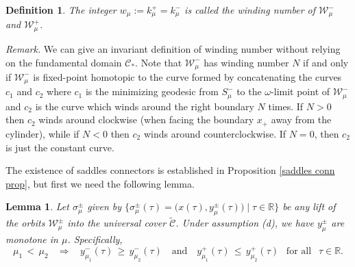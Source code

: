 \documentclass[11 pt]{article}
\newtheorem{lem}[thm]{Lemma}%
\newtheorem{Def}[thm]{Definition}%
\renewcommand\({\left(}
\renewcommand\){\right)}
\newcommand\wt{\widetilde}
\newcommand\s{\sigma}
\newcommand\<{\langle}
\renewcommand\>{\rangle}
\newcommand\8{\infty}
\newcommand{\R}{\mathbb R}
\newcommand{\mc}{\mathcal}
\begin{document}
\medskip
\medskip

\begin{Def}\label{winding number def}
\emph{
The integer $w_\mu := k^+_\mu = k^-_\mu$ is called the \emph{winding number} of $\mc{W}^-_\mu$ and $\mc{W}^+_\mu$. 
}
\end{Def}

\medskip
\medskip

\noindent\emph{Remark.}
We can give an invariant definition of winding number without relying on the fundamental domain $\mc{C}_*$. Note that $\mc{W}^-_\mu$ has winding number $N$ if and only if $\mc{W}^-_\mu$ is fixed-point homotopic to the curve formed by concatenating the curves $c_1$ and $c_2$ where $c_1$ is the minimizing geodesic from $S^-_\mu$ to the $\omega$-limit point of $\mc{W}^-_\mu$ and $c_2$ is the curve which winds around the right boundary $N$ times. If $N > 0$ then $c_2$ winds around clockwise (when facing the boundary $x_+$ away from the cylinder), while if $N < 0$ then $c_2$ winds around counterclockwise. If $N = 0$, then $c_2$ is just the constant curve.  


 

\medskip
\medskip

The existence of saddles connectors is established in Proposition \ref{saddles conn prop}, but first we need the following lemma.

\medskip
\medskip


\begin{lem}\label{lem 7.3 in JMP paper}
Let $\s^\pm_\mu$ given by  $\big\{ \s^\pm_\mu(\tau) = \big(x(\tau), y_\mu^\pm(\tau)\big) \mid \tau \in \R\big\}$ be any lift of the orbits $\mc{W}^\pm_\mu$ into the universal cover $\wt{\mc{C}}$. Under assumption \emph{(d)}, we have $y_\mu^\pm$ are monotone in $\mu$. Specifically,
\[
\mu_1 \,<\, \mu_2 \:\:\:\: \Longrightarrow \:\:\:\: y^-_{\mu_1}(\tau) \,\geq\, y^-_{\mu_2}(\tau) \:\:\: \text{ and } \:\:\: y^+_{\mu_1}(\tau) \,\leq\, y^+_{\mu_2}(\tau) \:\: \text{ for all } \:\: \tau \in \R. 
\]
\end{lem}
\end{document}
